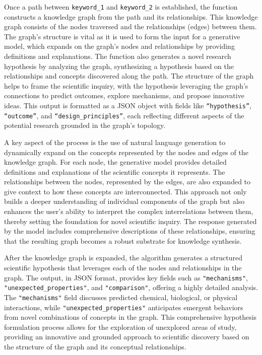 \documentclass{article}
\begin{document}
Once a path between \texttt{keyword\_1} and \texttt{keyword\_2} is established, the function constructs a knowledge graph from the path and its relationships. This knowledge graph consists of the nodes traversed and the relationships (edges) between them. The graph’s structure is vital as it is used to form the input for a generative model, which expands on the graph's nodes and relationships by providing definitions and explanations. The function also generates a novel research hypothesis by analyzing the graph, synthesizing a hypothesis based on the relationships and concepts discovered along the path. The structure of the graph helps to frame the scientific inquiry, with the hypothesis leveraging the graph’s connections to predict outcomes, explore mechanisms, and propose innovative ideas. This output is formatted as a JSON object with fields like \texttt{``hypothesis''}, \texttt{``outcome''}, and \texttt{``design\_principles''}, each reflecting different aspects of the potential research grounded in the graph's topology.

A key aspect of the process is the use of natural language generation to dynamically expand on the concepts represented by the nodes and edges of the knowledge graph. For each node, the generative model provides detailed definitions and explanations of the scientific concepts it represents. The relationships between the nodes, represented by the edges, are also expanded to give context to how these concepts are interconnected. This approach not only builds a deeper understanding of individual components of the graph but also enhances the user’s ability to interpret the complex interrelations between them, thereby setting the foundation for novel scientific inquiry. The response generated by the model includes comprehensive descriptions of these relationships, ensuring that the resulting graph becomes a robust substrate for knowledge synthesis.

After the knowledge graph is expanded, the algorithm generates a structured scientific hypothesis that leverages each of the nodes and relationships in the graph. The output, in JSON format, provides key fields such as \texttt{"mechanisms"}, \texttt{"unexpected\_properties"}, and \texttt{"comparison"}, offering a highly detailed analysis. The \texttt{"mechanisms"} field discusses predicted chemical, biological, or physical interactions, while \texttt{"unexpected\_properties"} anticipates emergent behaviors from novel combinations of concepts in the graph. This comprehensive hypothesis formulation process allows for the exploration of unexplored areas of study, providing an innovative and grounded approach to scientific discovery based on the structure of the graph and its conceptual relationships.
\end{document}
